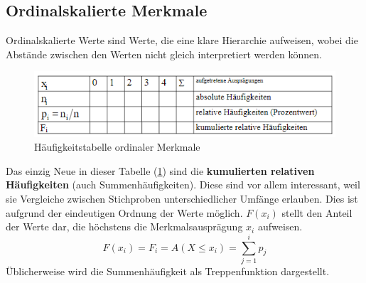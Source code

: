 \subsection{Ordinalskalierte Merkmale}
Ordinalskalierte Werte sind Werte, die eine klare Hierarchie aufweisen, wobei die Abstände zwischen den Werten nicht gleich interpretiert werden können.
\begin{figure}[h]
    \centering
    \includegraphics[width=\textwidth]{haeufigkeitstabelle-ordinale-merkmale}
    \caption{Häufigkeitstabelle ordinaler Merkmale}
    \label{fig:haeufigkeitstabelle-ordinale-merkmale}
\end{figure}
\newline
Das einzig Neue in dieser Tabelle (\ref{fig:haeufigkeitstabelle-ordinale-merkmale}) sind die \textbf{kumulierten relativen Häufigkeiten} (auch Summenhäufigkeiten).
Diese sind vor allem interessant, weil sie Vergleiche zwischen Stichproben unterschiedlicher Umfänge erlauben.
Dies ist aufgrund der eindeutigen Ordnung der Werte möglich.
$F(x_i)$ stellt den Anteil der Werte dar, die höchstens die Merkmalsausprägung $x_i$ aufweisen.
\[F(x_i) = F_i = A(X \leq x_i) = \sum_{j=1}^{i} p_j \]
Üblicherweise wird die Summenhäufigkeit als Treppenfunktion dargestellt.
